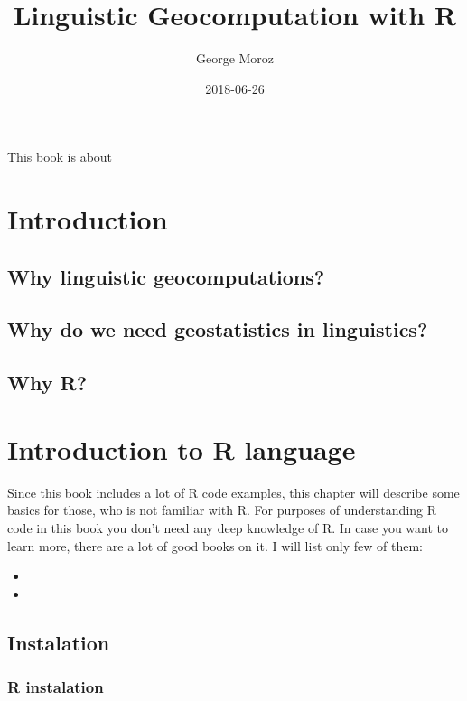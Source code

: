 \documentclass[]{book}
\title{Linguistic Geocomputation with R}
\author{George Moroz}
\date{2018-06-26}
\theoremstyle{definition}
\theoremstyle{definition}
\theoremstyle{definition}
\theoremstyle{remark}
\begin{document}
\maketitle

{
\setcounter{tocdepth}{1}
\tableofcontents
}
This book is about

\chapter{Introduction}\label{intro}

\section{Why linguistic
geocomputations?}\label{why-linguistic-geocomputations}

\section{Why do we need geostatistics in
linguistics?}\label{why-do-we-need-geostatistics-in-linguistics}

\section{Why R?}\label{why-r}

\chapter{Introduction to R language}\label{introduction-to-r-language}

Since this book includes a lot of R code examples, this chapter will
describe some basics for those, who is not familiar with R. For purposes
of understanding R code in this book you don't need any deep knowledge
of R. In case you want to learn more, there are a lot of good books on
it. I will list only few of them:

\begin{itemize}
\item
\item
\end{itemize}

\section{Instalation}\label{instalation}

\subsection{R instalation}\label{r-instalation}
\end{document}
